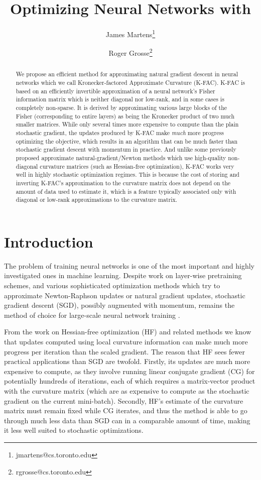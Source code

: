 \documentclass[12pt]{article}
\title{Optimizing Neural Networks with \fullname{}}
\author{James Martens\thanks{jmartens@cs.toronto.edu} }
\author{Roger Grosse\thanks{rgrosse@cs.toronto.edu}}
\affil{Department of Computer Science, University of Toronto}
\date{}
\newcommand{\fullname}{Kronecker-factored Approximate Curvature}
\newcommand{\acronym}{K-FAC}
\begin{document}
\maketitle

\begin{abstract} 
We propose an efficient method for approximating natural gradient descent in neural networks which we call \fullname{} (\acronym{}). \acronym{} is based on an efficiently invertible approximation of a neural network's Fisher information matrix which is neither diagonal nor low-rank, and in some cases is completely non-sparse.  It is derived by approximating various large blocks of the Fisher (corresponding to entire layers) as being the Kronecker product of two much smaller matrices.  While only several times more expensive to compute than the plain stochastic gradient, the updates produced by \acronym{} make \emph{much} more progress optimizing the objective, which results in an algorithm that can be much faster than stochastic gradient descent with momentum in practice.  And unlike some previously proposed approximate natural-gradient/Newton methods which use high-quality non-diagonal curvature matrices (such as Hessian-free optimization), \acronym{} works very well in highly stochastic optimization regimes.  This is because the cost of storing and inverting \acronym{}'s approximation to the curvature matrix does not depend on the amount of data used to estimate it, which is a feature typically associated only with diagonal or low-rank approximations to the curvature matrix.
\end{abstract} 


\section{Introduction}


The problem of training neural networks is one of the most important and highly investigated ones in machine learning.  Despite work on layer-wise pretraining schemes, and various sophisticated optimization methods which try to approximate Newton-Raphson updates or natural gradient updates, stochastic gradient descent (SGD), possibly augmented with momentum, remains the method of choice for large-scale neural network training \citep{momentum_ilya}.

From the work on Hessian-free optimization (HF) \citep{HF} and related methods \citep[e.g.][]{KSD} we know that updates computed using local curvature information can make much more progress per iteration than the scaled gradient.  The reason that HF sees fewer practical applications than SGD are twofold.  Firstly, its updates are much more expensive to compute, as they involve running linear conjugate gradient (CG) for potentially hundreds of iterations, each of which requires a matrix-vector product with the curvature matrix (which are as expensive to compute as the stochastic gradient on the current mini-batch).  Secondly, HF's estimate of the curvature matrix must remain fixed while CG iterates, and thus the method is able to go through much less data than SGD can in a comparable amount of time, making it less well suited to stochastic optimizations.
\end{document}
